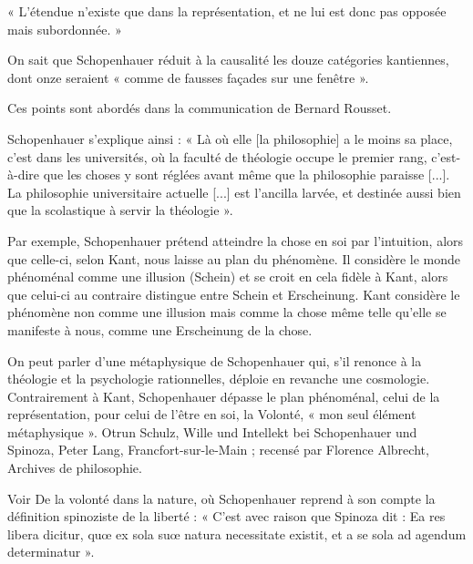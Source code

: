 « L’étendue n’existe que dans la représentation, et ne lui est
donc pas opposée mais subordonnée. »

On sait que Schopenhauer réduit à la causalité les douze catégories kantiennes, dont onze seraient
« comme de fausses façades sur une fenêtre ».

Ces points sont abordés dans la communication de Bernard Rousset.

Schopenhauer s’explique ainsi : « Là où elle [la philosophie] a le moins sa place, c’est dans les
universités, où la faculté de théologie occupe le premier rang, c’est-à-dire que les choses y sont réglées avant
même que la philosophie paraisse [...]. La philosophie universitaire actuelle [...] est l’ancilla larvée, et
destinée aussi bien que la scolastique à servir la théologie ».

Par exemple, Schopenhauer prétend atteindre la chose en soi par l’intuition, alors que celle-ci, selon Kant,
nous laisse au plan du phénomène. Il considère le monde phénoménal comme une illusion (Schein) et se croit
en cela fidèle à Kant, alors que celui-ci au contraire distingue entre Schein et Erscheinung. Kant considère le
phénomène non comme une illusion mais comme la chose même telle qu’elle se manifeste à nous, comme
une Erscheinung de la chose.

On peut parler d’une métaphysique de Schopenhauer qui, s’il renonce à la théologie et la psychologie
rationnelles, déploie en revanche une cosmologie. Contrairement à Kant, Schopenhauer dépasse le plan
phénoménal, celui de la représentation, pour celui de l’être en soi, la Volonté, « mon seul élément
métaphysique ».
Otrun Schulz, Wille und Intellekt bei Schopenhauer und Spinoza, Peter Lang, Francfort-sur-le-Main ; recensé par Florence Albrecht, Archives de philosophie.

Voir De la volonté dans la nature, où Schopenhauer reprend à son compte la définition spinoziste
de la liberté : « C’est avec raison que Spinoza dit : Ea res libera dicitur, quœ ex sola suœ natura necessitate
existit, et a se sola ad agendum determinatur ».

